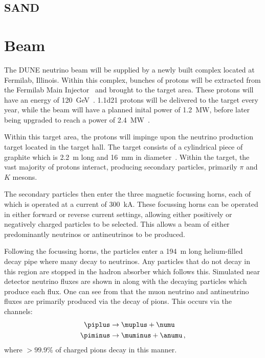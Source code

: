 \subsection{SAND}
\label{sec:dune:nd:sand}

\section{Beam}
\label{sec:dune:beam}

The DUNE neutrino beam will be supplied by a newly built complex located at Fermilab, Illinois.
Within this complex, bunches of protons will be extracted from the Fermilab Main Injector~\cite{mainInjector} and brought to the target area.
These protons will have an energy of \SI{120}{\giga\electronvolt}~\cite{duneBeam}.
\num{1.1d21} protons will be delivered to the target every year, while the beam will have a planned inital power of \SI{1.2}{\mega\watt}, before later being upgraded to reach a power of \SI{2.4}{\mega\watt}~\cite{duneBeam}.

Within this target area, the protons will impinge upon the neutrino production target located in the target hall.
The target consists of a cylindrical piece of graphite which is \SI{2.2}{\metre} long and \SI{16}{\milli\metre} in diameter~\cite{duneBeam}.
Within the target, the vast majority of protons interact, producing secondary particles, primarily $\pi$ and $K$ mesons.

The secondary particles then enter the three magnetic focussing horns, each of which is operated at a current of \SI{300}{\kilo\ampere}.
These focussing horns can be operated in either forward or reverse current settings, allowing either positively or negatively charged particles to be selected.
This allows a beam of either predominantly neutrinos or antineutrinos to be produced.

Following the focussing horns, the particles enter a \SI{194}{\metre} long helium-filled decay pipe where many decay to neutrinos.
Any particles that do not decay in this region are stopped in the hadron absorber which follows this.
Simulated near detector neutrino fluxes are shown in  along with the decaying particles which produce each flux.
One can see from  that the muon neutrino and antineutrino fluxes are primarily produced via the decay of pions.
This occurs via the channels:
\begin{align}
  \piplus &\rightarrow \muplus + \numu \\
  \piminus &\rightarrow \muminus + \anumu \, ,
\end{align}
where $>99.9\%$ of charged pions decay in this manner.

